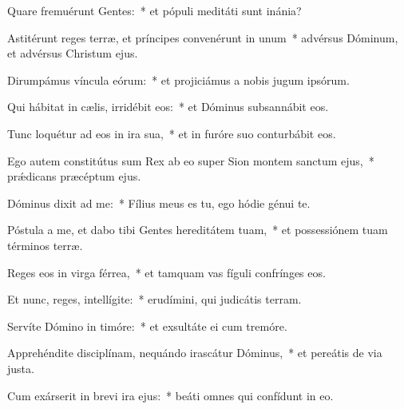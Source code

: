 \item Quare fremuérunt Gentes:~* et pópuli meditáti sunt inánia?

\item Astitérunt reges terræ, et príncipes convenérunt in unum~* advérsus Dóminum, et advérsus Christum ejus.

\item Dirumpámus víncula eórum:~* et projiciámus a nobis jugum ipsórum.

\item Qui hábitat in cælis, irridébit eos:~* et Dóminus subsannábit eos.

\item Tunc loquétur ad eos in ira sua,~* et in furóre suo conturbábit eos.

\item Ego autem constitútus sum Rex ab eo super Sion montem sanctum ejus,~* prǽdicans præcéptum ejus.

\item Dóminus dixit ad me:~* Fílius meus es tu, ego hódie génui te.

\item Póstula a me, et dabo tibi Gentes hereditátem tuam,~* et possessiónem tuam términos terræ.

\item Reges eos in virga férrea,~* et tamquam vas fíguli confrínges eos.

\item Et nunc, reges, intellígite:~* erudímini, qui judicátis terram.

\item Servíte Dómino in timóre:~* et exsultáte ei cum tremóre.

\item Apprehéndite disciplínam, nequándo irascátur Dóminus,~* et pereátis de via justa.

\item Cum exárserit in brevi ira ejus:~* beáti omnes qui confídunt in eo.
